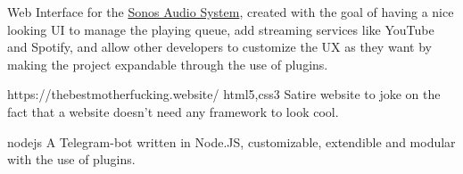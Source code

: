 \begin{CV}
    

    {Web Interface for the \href{https://sonos.com/}{Sonos Audio System}, created with the goal of having a
    nice looking UI to manage the playing queue, add streaming services like YouTube and Spotify, and allow
    other developers to customize the UX as they want by making the project expandable through the use of plugins.}
    
    {https://thebestmotherfucking.website/}
    {html5,css3}
    {Satire website to joke on the fact that a website doesn't need any framework to look cool.}
    
    {nodejs}
    {A Telegram-bot written in Node.JS, customizable, extendible and modular with the use of plugins.}


    
    
\end{CV}
